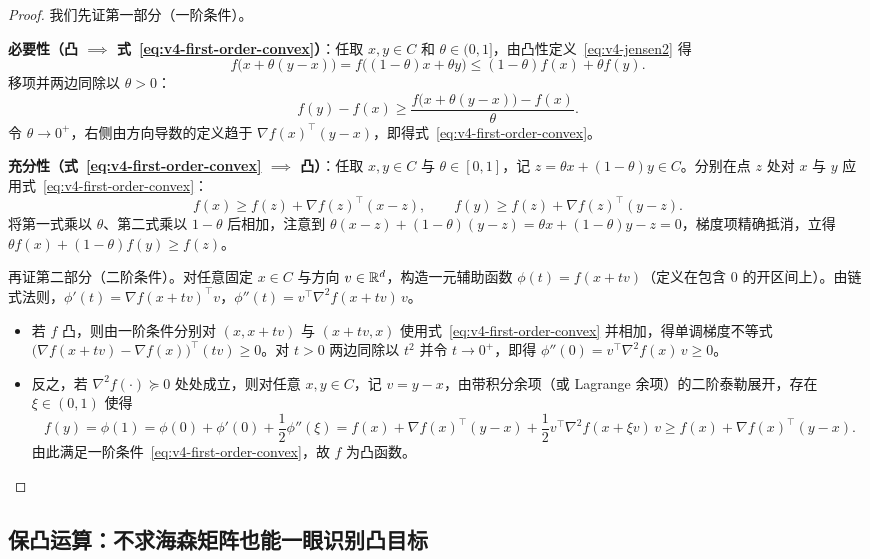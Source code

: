 \begin{proof}
我们先证第一部分（一阶条件）。

\textbf{必要性（凸 $\implies$ 式~\eqref{eq:v4-first-order-convex}）}：任取 $x, y \in C$ 和 $\theta \in (0, 1]$，由凸性定义~\eqref{eq:v4-jensen2} 得
\[
  f\big(x + \theta(y - x)\big) = f\big((1-\theta)x + \theta y\big) \le (1-\theta)f(x) + \theta f(y).
\]
移项并两边同除以 $\theta > 0$：
\[
  f(y) - f(x) \ge \frac{f\big(x + \theta(y-x)\big) - f(x)}{\theta}.
\]
令 $\theta \to 0^+$，右侧由方向导数的定义趋于 $\nabla f(x)^\top (y - x)$，即得式~\eqref{eq:v4-first-order-convex}。

\textbf{充分性（式~\eqref{eq:v4-first-order-convex} $\implies$ 凸）}：任取 $x, y \in C$ 与 $\theta \in [0, 1]$，记 $z = \theta x + (1-\theta)y \in C$。分别在点 $z$ 处对 $x$ 与 $y$ 应用式~\eqref{eq:v4-first-order-convex}：
\[
  f(x) \ge f(z) + \nabla f(z)^\top (x - z), \qquad f(y) \ge f(z) + \nabla f(z)^\top (y - z).
\]
将第一式乘以 $\theta$、第二式乘以 $1-\theta$ 后相加，注意到 $\theta(x-z) + (1-\theta)(y-z) = \theta x + (1-\theta)y - z = 0$，梯度项精确抵消，立得 $\theta f(x) + (1-\theta)f(y) \ge f(z)$。

再证第二部分（二阶条件）。对任意固定 $x \in C$ 与方向 $v \in \mathbb{R}^d$，构造一元辅助函数 $\phi(t) = f(x + t v)$（定义在包含 $0$ 的开区间上）。由链式法则，$\phi'(t) = \nabla f(x+tv)^\top v$，$\phi''(t) = v^\top \nabla^2 f(x+tv)\, v$。
\begin{itemize}
  \item 若 $f$ 凸，则由一阶条件分别对 $(x, x+tv)$ 与 $(x+tv, x)$ 使用式~\eqref{eq:v4-first-order-convex} 并相加，得单调梯度不等式 $\big(\nabla f(x+tv)-\nabla f(x)\big)^\top (tv) \ge 0$。对 $t>0$ 两边同除以 $t^2$ 并令 $t \to 0^+$，即得 $\phi''(0) = v^\top \nabla^2 f(x)\, v \ge 0$。
  \item 反之，若 $\nabla^2 f(\cdot) \succeq 0$ 处处成立，则对任意 $x, y \in C$，记 $v = y-x$，由带积分余项（或 Lagrange 余项）的二阶泰勒展开，存在 $\xi \in (0, 1)$ 使得
  \[
    f(y) = \phi(1) = \phi(0) + \phi'(0) + \frac{1}{2}\phi''(\xi) = f(x) + \nabla f(x)^\top (y-x) + \frac{1}{2}v^\top \nabla^2 f(x+\xi v)\, v \ge f(x) + \nabla f(x)^\top (y-x).
  \]
  由此满足一阶条件~\eqref{eq:v4-first-order-convex}，故 $f$ 为凸函数。
\end{itemize}
\end{proof}

\subsection{保凸运算：不求海森矩阵也能一眼识别凸目标}

